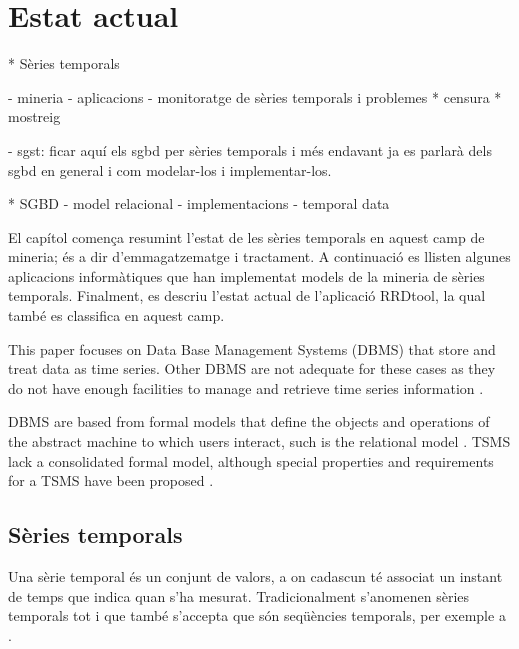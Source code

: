 \chapter{Estat actual}
\label{cap:estat}


* Sèries temporals
  
  - mineria
  - aplicacions
  - monitoratge de sèries temporals i problemes
     * censura
     * mostreig

  - sgst: 
      ficar aquí els sgbd per sèries temporals i més endavant ja es parlarà dels sgbd en general i com modelar-los i implementar-los.


* SGBD
 - model relacional
 - implementacions
 - temporal data






El capítol comença resumint l'estat de les sèries temporals en aquest camp de mineria; és a dir d'emmagatzematge i tractament. A continuació es llisten algunes aplicacions informàtiques que han implementat models de la mineria de sèries temporals. Finalment, es descriu l'estat actual de l'aplicació RRDtool, la qual també es classifica en aquest camp.

This paper focuses on Data Base Management Systems (DBMS) that store
and treat data as time series.   Other DBMS are not adequate for these cases as they do not have enough facilities to manage and retrieve time series
information \parencite{schmidt95}.

DBMS are based from formal models that define the objects and
operations of the abstract machine to which users interact, such is
the relational model \parencite{date}. TSMS lack a consolidated formal
model, although special properties and requirements for a TSMS
have been proposed \parencite{dreyer94}.



\section{Sèries temporals}

Una sèrie temporal és un conjunt de valors, a on cadascun té associat un instant de temps que indica quan s'ha mesurat.
Tradicionalment s'anomenen sèries temporals tot i que també s'accepta que són seqüències temporals, per exemple a \cite{last:hetland}.

